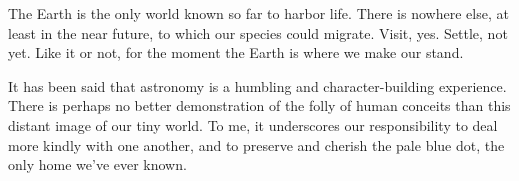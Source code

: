 The Earth is the only world known so far to harbor life. There is nowhere else, at least in the near future, to which our species could migrate. Visit, yes. Settle, not yet. Like it or not, for the moment the Earth is where we make our stand.

It has been said that astronomy is a humbling and character-building experience. There is perhaps no better demonstration of the folly of human conceits than this distant image of our tiny world. To me, it underscores our responsibility to deal more kindly with one another, and to preserve and cherish the pale blue dot, the only home we've ever known.

